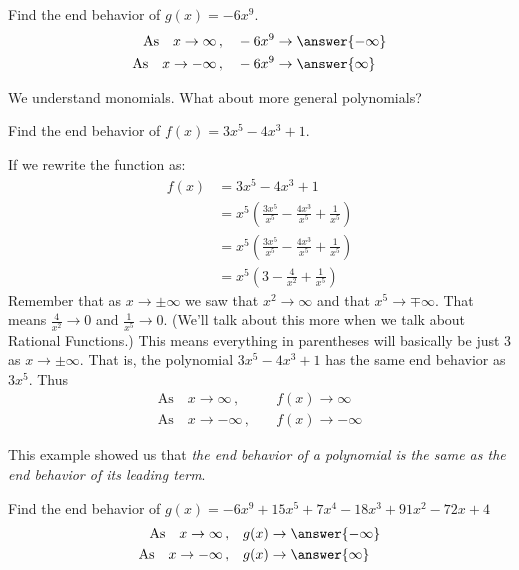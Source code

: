\documentclass{ximera}
\begin{document}
\begin{problem}
	Find the end behavior of $g(x) = -6 x^9$.
	\begin{align*}
		\text{As} \quad x \to \infty \, ,  \quad & -6x^9 \to \answer{-\infty} \\
		\text{As} \quad x \to -\infty \, , \quad & -6x^9 \to \answer{\infty} 
	\end{align*}
\end{problem}


We understand monomials.  What about more general polynomials? 
\begin{example}
	Find the end behavior of $f(x) = 3x^5 - 4x^3 + 1$.
	\begin{explanation}
		If we rewrite the function as:
		\begin{align*}
			f(x) &= 3x^5 - 4x^3 + 1 \\
				&= x^5 \left( \frac{3x^5}{x^5} - \frac{4x^3}{x^5} + \frac{1}{x^5} \right)\\
				&=x^5 \left( \frac{3x^5}{x^5} - \frac{4x^3}{x^5} + \frac{1}{x^5} \right)\\
				&= x^5 \left( 3 - \frac{4}{x^2} + \frac{1}{x^5} \right)
		\end{align*}
		Remember that as $x\to \pm\infty$ we saw that $x^2 \to \infty$ and that $x^5 \to \mp \infty$.  That means $\frac{4}{x^2} \to 0$ and $\frac{1}{x^5} \to 0$. 
		(We'll talk about this more when we talk about Rational Functions.)  This means everything in parentheses will basically be just $3$ as $x \to \pm \infty$.
		That is, the polynomial $3x^5 - 4x^3 + 1$ has the same end behavior as $3x^5$.  Thus
		\begin{align*}
			\text{As} \quad x \to \infty \, ,  \quad & f(x) \to \infty \\
			\text{As} \quad x \to -\infty \, , \quad & f(x) \to -\infty 
		\end{align*}
	\end{explanation}
\end{example}

This example showed us that \emph{the end behavior of a polynomial is the same as the end behavior of its leading term}.
\begin{problem}
	Find the end behavior of $g(x) = -6x^9 + 15x^5 + 7 x^4 - 18 x^3 + 91x^2 - 72 x + 4$
	\begin{align*}
		\text{As} \quad x \to \infty \, ,  \quad & g(x) \to \answer{-\infty} \\
		\text{As} \quad x \to -\infty \, , \quad & g(x) \to \answer{\infty} 
	\end{align*}
\end{problem}
\end{document}
